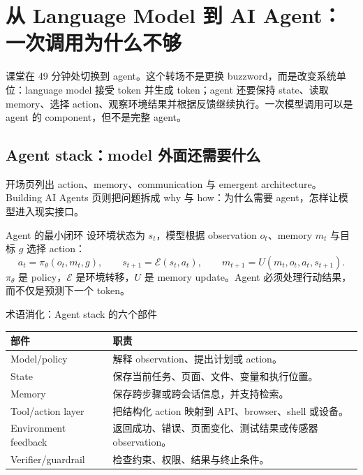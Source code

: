 \section{从 Language Model 到 AI Agent：一次调用为什么不够}

课堂在 49 分钟处切换到 agent。这个转场不是更换 buzzword，而是改变系统单位：language model 接受 token 并生成 token；agent 还要保持 state、读取 memory、选择 action、观察环境结果并根据反馈继续执行。一次模型调用可以是 agent 的 component，但不是完整 agent。

\subsection{Agent stack：model 外面还需要什么}

开场页列出 action、memory、communication 与 emergent architecture。Building AI Agents 页则把问题拆成 why 与 how：为什么需要 agent，怎样让模型进入现实接口。



\begin{importantbox}{Agent 的最小闭环}
设环境状态为 $s_t$，模型根据 observation $o_t$、memory $m_t$ 与目标 $g$ 选择 action：
\[
a_t=\pi_\theta(o_t,m_t,g),\qquad
s_{t+1}=\mathcal{E}(s_t,a_t),\qquad
m_{t+1}=U(m_t,o_t,a_t,s_{t+1}).
\]
$\pi_\theta$ 是 policy，$\mathcal{E}$ 是环境转移，$U$ 是 memory update。Agent 必须处理行动结果，而不仅是预测下一个 token。
\end{importantbox}



\begin{knowledgebox}{术语消化：Agent stack 的六个部件}
\begin{tabularx}{\textwidth}{L{0.19\textwidth} X}
\toprule
部件 & 职责 \\
\midrule
Model/policy & 解释 observation、提出计划或 action。 \\
State & 保存当前任务、页面、文件、变量和执行位置。 \\
Memory & 保存跨步骤或跨会话信息，并支持检索。 \\
Tool/action layer & 把结构化 action 映射到 API、browser、shell 或设备。 \\
Environment feedback & 返回成功、错误、页面变化、测试结果或传感器 observation。 \\
Verifier/guardrail & 检查约束、权限、结果与终止条件。 \\
\bottomrule
\end{tabularx}
\end{knowledgebox}

